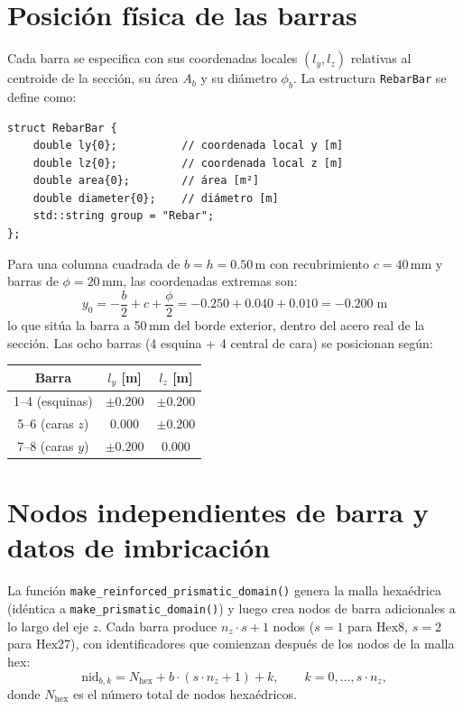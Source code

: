 \section{Posición física de las barras}
\label{sec:emb-position}

Cada barra se especifica con sus coordenadas locales $(l_y, l_z)$
relativas al centroide de la sección, su área $A_b$ y su diámetro
$\phi_b$.  La estructura \texttt{RebarBar} se define como:

\begin{verbatim}
struct RebarBar {
    double ly{0};          // coordenada local y [m]
    double lz{0};          // coordenada local z [m]
    double area{0};        // área [m²]
    double diameter{0};    // diámetro [m]
    std::string group = "Rebar";
};
\end{verbatim}

Para una columna cuadrada de $b = h = 0{.}50$\,m con recubrimiento
$c = 40$\,mm y barras de $\phi = 20$\,mm, las coordenadas extremas son:
%
\begin{equation}
  y_0 = -\frac{b}{2} + c + \frac{\phi}{2}
      = -0{.}250 + 0{.}040 + 0{.}010 = -0{.}200\;\text{m}
\end{equation}
%
lo que sitúa la barra a 50\,mm del borde exterior, dentro del acero
real de la sección.  Las ocho barras (4 esquina + 4 central de cara)
se posicionan según:
%
\begin{center}
\begin{tabular}{ccc}
\toprule
Barra & $l_y$ [m] & $l_z$ [m] \\
\midrule
1--4 (esquinas) & $\pm 0{.}200$ & $\pm 0{.}200$ \\
5--6 (caras $z$) & $0{.}000$ & $\pm 0{.}200$ \\
7--8 (caras $y$) & $\pm 0{.}200$ & $0{.}000$ \\
\bottomrule
\end{tabular}
\end{center}


\section{Nodos independientes de barra y datos de imbricación}
\label{sec:emb-nodes}

La función \texttt{make\_reinforced\_prismatic\_domain()} genera la
malla hexaédrica (idéntica a \texttt{make\_prismatic\_domain()}) y
luego crea nodos de barra adicionales a lo largo del eje $z$.  Cada
barra produce $n_z \cdot s + 1$ nodos ($s = 1$ para Hex8, $s = 2$ para
Hex27), con identificadores que comienzan después de los nodos de la
malla hex:
%
\begin{equation}
  \text{nid}_{b,k} = N_{\text{hex}} + b \cdot
    (s \cdot n_z + 1) + k, \qquad k = 0, \ldots, s \cdot n_z,
\end{equation}
%
donde $N_{\text{hex}}$ es el número total de nodos hexaédricos.

